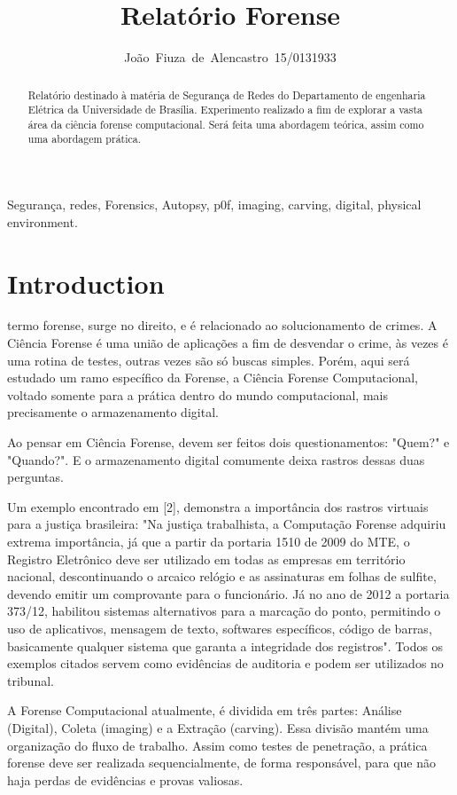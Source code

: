 \documentclass[journal]{IEEEtran}
\begin{document}
\title{Relatório Forense}


\author{João~Fiuza~de~Alencastro~15/0131933}%




\maketitle


\begin{abstract}
Relatório destinado à matéria de Segurança de Redes do Departamento de engenharia Elétrica da Universidade de Brasília. Experimento realizado a fim de explorar a vasta área da ciência forense computacional. Será feita uma abordagem teórica, assim como uma abordagem prática.
\end{abstract}

\begin{IEEEkeywords}
Segurança, redes, Forensics, Autopsy, p0f, imaging, carving, digital, physical environment.
\end{IEEEkeywords}


\IEEEpeerreviewmaketitle



\section{Introduction}
 termo forense, surge no direito, e é relacionado ao solucionamento de crimes. A Ciência Forense é uma união de aplicações a fim de desvendar o crime, às vezes é uma rotina de testes, outras vezes são só buscas simples. Porém, aqui será estudado um ramo específico da Forense, a Ciência Forense Computacional, voltado somente para a prática dentro do mundo computacional, mais precisamente o armazenamento digital. \par
Ao pensar em Ciência Forense, devem ser feitos dois questionamentos: "Quem?" e "Quando?". E o armazenamento digital comumente deixa rastros dessas duas perguntas. \par
Um exemplo encontrado em [2], demonstra a importância dos rastros virtuais para a justiça brasileira: "Na justiça trabalhista, a Computação Forense adquiriu extrema importância, já que a partir da portaria 1510 de 2009 do MTE, o Registro Eletrônico deve ser utilizado em todas as empresas em território nacional, descontinuando o arcaico relógio e as assinaturas em folhas de sulfite, devendo emitir um comprovante para o funcionário. Já no ano de 2012 a portaria 373/12, habilitou sistemas alternativos para a marcação do ponto, permitindo o uso de aplicativos, mensagem de texto, softwares específicos, código de barras, basicamente qualquer sistema que garanta a integridade dos registros". Todos os exemplos citados servem como evidências de auditoria e podem ser utilizados no tribunal. \par
A Forense Computacional atualmente, é dividida em três partes: Análise (Digital), Coleta (imaging) e a Extração (carving). Essa divisão mantém uma organização do fluxo de trabalho. Assim como testes de penetração, a prática forense deve ser realizada sequencialmente, de forma responsável, para que não haja perdas de evidências e provas valiosas.
\end{document}
